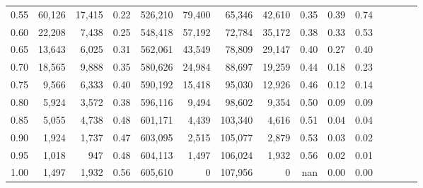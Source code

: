 \begin{tabular}{rrrcrrrrrrrrrrr}
0.55 &  60,126 &  17,415 &                                       0.22 &  526,210 &   79,400 &   65,346 &   42,610 &  0.35 &  0.39 &                         0.74 \\
0.60 &  22,208 &   7,438 &                                       0.25 &  548,418 &   57,192 &   72,784 &   35,172 &  0.38 &  0.33 &                         0.53 \\
0.65 &  13,643 &   6,025 &                                       0.31 &  562,061 &   43,549 &   78,809 &   29,147 &  0.40 &  0.27 &                         0.40 \\
0.70 &  18,565 &   9,888 &                                       0.35 &  580,626 &   24,984 &   88,697 &   19,259 &  0.44 &  0.18 &                         0.23 \\
0.75 &   9,566 &   6,333 &                                       0.40 &  590,192 &   15,418 &   95,030 &   12,926 &  0.46 &  0.12 &                         0.14 \\
0.80 &   5,924 &   3,572 &                                       0.38 &  596,116 &    9,494 &   98,602 &    9,354 &  0.50 &  0.09 &                         0.09 \\
0.85 &   5,055 &   4,738 &                                       0.48 &  601,171 &    4,439 &  103,340 &    4,616 &  0.51 &  0.04 &                         0.04 \\
0.90 &   1,924 &   1,737 &                                       0.47 &  603,095 &    2,515 &  105,077 &    2,879 &  0.53 &  0.03 &                         0.02 \\
0.95 &   1,018 &     947 &                                       0.48 &  604,113 &    1,497 &  106,024 &    1,932 &  0.56 &  0.02 &                         0.01 \\
1.00 &   1,497 &   1,932 &                                       0.56 &  605,610 &        0 &  107,956 &        0 &   nan &  0.00 &                         0.00 \\
\bottomrule
\end{tabular}
